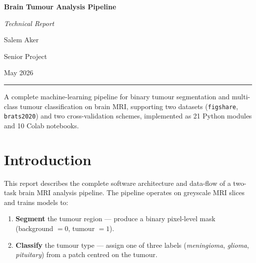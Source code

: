 \documentclass[12pt,a4paper]{article}
\begin{document}

\begin{titlepage}
  \centering
  \vspace*{2cm}
  {\huge\bfseries Brain Tumour Analysis Pipeline\par}
  \vspace{0.5cm}
  {\Large\itshape Technical Report\par}
  \vspace{2cm}
  {\large Salem Aker\par}
  \vspace{0.4cm}
  {\normalsize Senior Project\par}
  \vspace{0.4cm}
  {\normalsize May 2026\par}
  \vfill
  \rule{\textwidth}{0.5pt}
  \vspace{0.3cm}
  {\small
    A complete machine-learning pipeline for binary tumour segmentation and
    multi-class tumour classification on brain MRI, supporting two datasets
    (\texttt{figshare}, \texttt{brats2020}) and two cross-validation schemes,
    implemented as 21 Python modules and 10 Colab notebooks.
  }
\end{titlepage}

\tableofcontents
\newpage

\section{Introduction}

This report describes the complete software architecture and data-flow of a
two-task brain MRI analysis pipeline.  The pipeline operates on greyscale MRI
slices and trains models to:

\begin{enumerate}[leftmargin=1.5em]
  \item \textbf{Segment} the tumour region --- produce a binary pixel-level mask
    (background $= 0$, tumour $= 1$).
  \item \textbf{Classify} the tumour type --- assign one of three labels
    (\textit{meningioma}, \textit{glioma}, \textit{pituitary}) from a patch
    centred on the tumour.
\end{enumerate}
\end{document}

